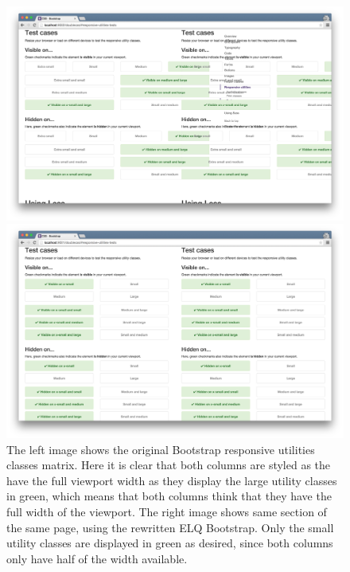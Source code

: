 \documentclass[a4paper,11pt]{kth-mag}
\begin{document}
      \begin{figure}[htbp]
        \centering
        \begin{minipage}{.5\textwidth}
          \centering
          \includegraphics[width=\linewidth]{images/bootstrap-mq-matrix}
        \end{minipage}%
        \begin{minipage}{.5\textwidth}
          \centering
          \includegraphics[width=\linewidth]{images/bootstrap-eq-matrix}
        \end{minipage}
        \caption{
          The left image shows the original Bootstrap responsive utilities classes matrix.
          Here it is clear that both columns are styled as the have the full viewport width as they display the large utility classes in green, which means that both columns think that they have the full width of the viewport.
          The right image shows same section of the same page, using the rewritten \gls{ELQ} Bootstrap.
          Only the small utility classes are displayed in green as desired, since both columns only have half of the width available.
        }
        \label{fig:eval-bootstrap-mq-eq-matrix}
      \end{figure}
\end{document}
